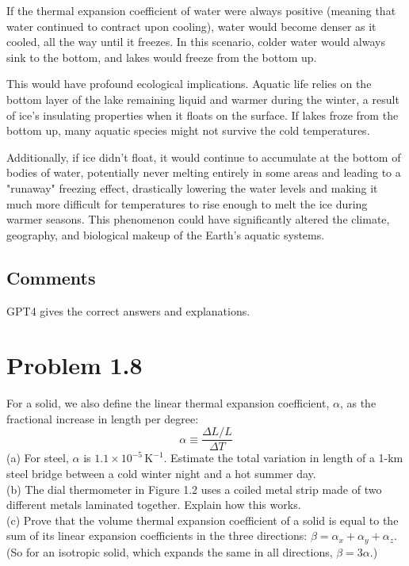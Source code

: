 \documentclass[12pt]{article}
\begin{document}
If the thermal expansion coefficient of water were always positive (meaning that water continued to contract upon cooling), water would become denser as it cooled, all the way until it freezes. In this scenario, colder water would always sink to the bottom, and lakes would freeze from the bottom up.

This would have profound ecological implications. Aquatic life relies on the bottom layer of the lake remaining liquid and warmer during the winter, a result of ice's insulating properties when it floats on the surface. If lakes froze from the bottom up, many aquatic species might not survive the cold temperatures.

Additionally, if ice didn't float, it would continue to accumulate at the bottom of bodies of water, potentially never melting entirely in some areas and leading to a "runaway" freezing effect, drastically lowering the water levels and making it much more difficult for temperatures to rise enough to melt the ice during warmer seasons. This phenomenon could have significantly altered the climate, geography, and biological makeup of the Earth's aquatic systems.

\subsection*{Comments}

GPT4 gives the correct answers and explanations.

\section*{Problem 1.8}

For a solid, we also define the linear thermal expansion coefficient, $\alpha$, as the fractional increase in length per degree:
\[
\alpha \equiv \frac{\Delta L / L}{\Delta T}
\]
(a) For steel, $\alpha$ is $1.1 \times 10^{-5} \, \mathrm{K}^{-1}$. Estimate the total variation in length of a 1-km steel bridge between a cold winter night and a hot summer day. \\
(b) The dial thermometer in Figure 1.2 uses a coiled metal strip made of two different metals laminated together. Explain how this works. \\
(c) Prove that the volume thermal expansion coefficient of a solid is equal to the sum of its linear expansion coefficients in the three directions: $\beta= \alpha_x+\alpha_y+\alpha_z$. (So for an isotropic solid, which expands the same in all directions, $\beta=3 \alpha$.) \\
\end{document}
